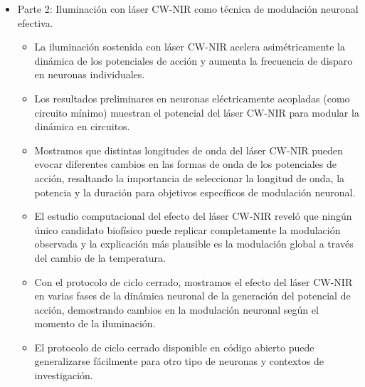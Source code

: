 \begin{itemize}
	\item Parte 2: Iluminación con láser CW-NIR como técnica de modulación neuronal efectiva.
	\begin{itemize}
		\item La iluminación sostenida con láser CW-NIR acelera asimétricamente la dinámica de los potenciales de acción y aumenta la frecuencia de disparo en neuronas individuales.
		\item Los resultados preliminares en neuronas eléctricamente acopladas (como circuito mí\-nimo) muestran el potencial del láser CW-NIR para modular la dinámica en circuitos.
		\item Mostramos que distintas longitudes de onda del láser CW-NIR pueden evocar diferentes cambios en las formas de onda de los potenciales de acción, resaltando la importancia de seleccionar la longitud de onda, la potencia y la duración para objetivos específicos de modulación neuronal.
		\item    El estudio computacional del efecto del láser CW-NIR reveló que ningún único candidato biofísico puede replicar completamente la modulación observada y la explicación más plausible es la modulación global a través del cambio de la temperatura.
		\item Con el protocolo de ciclo cerrado, mostramos el efecto del láser CW-NIR en varias fases de la dinámica neuronal de la generación del potencial de acción, demostrando cambios en la modulación neuronal según el momento de la iluminación.
		\item El protocolo de ciclo cerrado disponible en código abierto puede generalizarse fácilmente para otro tipo de neuronas y contextos de investigación.
	\end{itemize}
	
\end{itemize}

